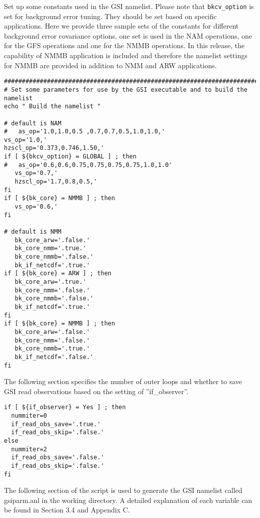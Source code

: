 Set up some constants used in the GSI namelist. Please note that \verb|bkcv_option| is set for background error tuning. They should be set based on specific applications. Here we provide three sample sets of the constants for different background error covariance options, one set is used in the NAM operations, one for the GFS operations and one for the NMMB operations. In this release, the capability of NMMB application is included and therefore the namelist settings for NMMB are provided in addition to NMM and ARW applications.

\begin{footnotesize}
\begin{verbatim}
##################################################################################
# Set some parameters for use by the GSI executable and to build the namelist
echo " Build the namelist "

# default is NAM
#   as_op='1.0,1.0,0.5 ,0.7,0.7,0.5,1.0,1.0,'
vs_op='1.0,'
hzscl_op='0.373,0.746,1.50,'
if [ ${bkcv_option} = GLOBAL ] ; then
#   as_op='0.6,0.6,0.75,0.75,0.75,0.75,1.0,1.0'
   vs_op='0.7,'
   hzscl_op='1.7,0.8,0.5,'
fi
if [ ${bk_core} = NMMB ] ; then
   vs_op='0.6,'
fi

# default is NMM
   bk_core_arw='.false.'
   bk_core_nmm='.true.'
   bk_core_nmmb='.false.'
   bk_if_netcdf='.true.'
if [ ${bk_core} = ARW ] ; then
   bk_core_arw='.true.'
   bk_core_nmm='.false.'
   bk_core_nmmb='.false.'
   bk_if_netcdf='.true.'
fi
if [ ${bk_core} = NMMB ] ; then
   bk_core_arw='.false.'
   bk_core_nmm='.false.'
   bk_core_nmmb='.true.'
   bk_if_netcdf='.false.'
fi

\end{verbatim}
\end{footnotesize}

The following section specifies the number of outer loops and whether to save GSI read observations based on the setting of ''if\_observer''.

\begin{footnotesize}
\begin{verbatim}
if [ ${if_observer} = Yes ] ; then
  nummiter=0
  if_read_obs_save='.true.'
  if_read_obs_skip='.false.'
else
  nummiter=2
  if_read_obs_save='.false.'
  if_read_obs_skip='.false.'
fi
\end{verbatim}
\end{footnotesize}

The following section of the script is used to generate the GSI namelist called gsiparm.anl in the working directory. A detailed explanation of each variable can be found in Section 3.4 and Appendix C. 

